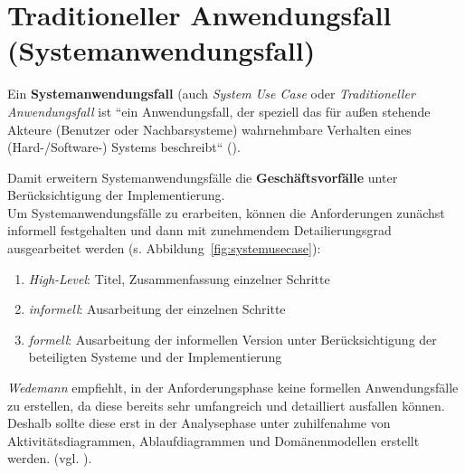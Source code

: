 
\section{Traditioneller Anwendungsfall (Systemanwendungsfall)}


\begin{tcolorbox}[title={Traditioneller Anwendungsfall (Systemanwendungsfall)}]
    Ein \textbf{Systemanwendungsfall} (auch \textit{System Use Case} oder \textit{Traditioneller Anwendungsfall}
    ist ``ein Anwendungsfall, der speziell das für außen stehende Akteure (Benutzer oder Nachbarsysteme) wahrnehmbare Verhalten eines (Hard-/Software-) Systems beschreibt`` (\cite[361]{Oes05}).\\
\end{tcolorbox}

\noindent
Damit erweitern Systemanwendungsfälle die \textbf{Geschäftsvorfälle} unter Berücksichtigung der Implementierung.\\

\noindent
Um Systemanwendungsfälle zu erarbeiten, können die Anforderungen zunächst informell festgehalten und dann mit zunehmendem Detailierungsgrad ausgearbeitet werden (s. Abbildung~\ref{fig:systemusecase}):

\begin{enumerate}
    \item \textit{High-Level}: Titel, Zusammenfassung einzelner Schritte
    \item \textit{informell}: Ausarbeitung der einzelnen Schritte
    \item \textit{formell}: Ausarbeitung der informellen Version unter Berücksichtigung der beteiligten Systeme und der Implementierung
\end{enumerate}

\noindent
\textit{Wedemann} empfiehlt, in der Anforderungsphase keine formellen Anwendungsfälle zu erstellen, da diese bereits sehr umfangreich und detailliert ausfallen können.
Deshalb sollte diese erst in der Analysephase unter zuhilfenahme von Aktivitätsdiagrammen, Ablaufdiagrammen und Domänenmodellen erstellt werden. (vgl. \cite[71]{Wed09}).

